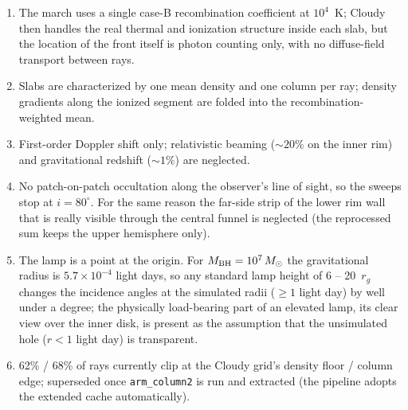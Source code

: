 \documentclass[11pt]{article}
\begin{document}
\begin{enumerate}
\item The march uses a single case-B recombination coefficient at
      $10^4$~K; Cloudy then handles the real thermal and ionization
      structure inside each slab, but the location of the front itself
      is photon counting only, with no diffuse-field transport between
      rays.
\item Slabs are characterized by one mean density and one column per
      ray; density gradients along the ionized segment are folded into
      the recombination-weighted mean.
\item First-order Doppler shift only; relativistic beaming
      ($\sim20\%$ on the inner rim) and gravitational redshift
      ($\sim1\%$) are neglected.
\item No patch-on-patch occultation along the observer's line of
      sight, so the sweeps stop at $i = 80^\circ$. For the same reason
      the far-side strip of the lower rim wall that is really visible
      through the central funnel is neglected (the reprocessed sum
      keeps the upper hemisphere only).
\item The lamp is a point at the origin. For
      $M_{\rm BH} = 10^7\,M_\odot$ the gravitational radius is
      $5.7\times10^{-4}$ light days, so any standard lamp height of
      6 -- 20~$r_g$ changes the incidence angles at the simulated radii
      ($\geq 1$ light day) by well under a degree; the physically
      load-bearing part of an elevated lamp, its clear view over the
      inner disk, is present as the assumption that the unsimulated
      hole ($r < 1$ light day) is transparent.
\item 62\% / 68\% of rays currently clip at the Cloudy grid's density
      floor / column edge; superseded once \texttt{arm\_column2} is
      run and extracted (the pipeline adopts the extended cache
      automatically).
\end{enumerate}
\end{document}
